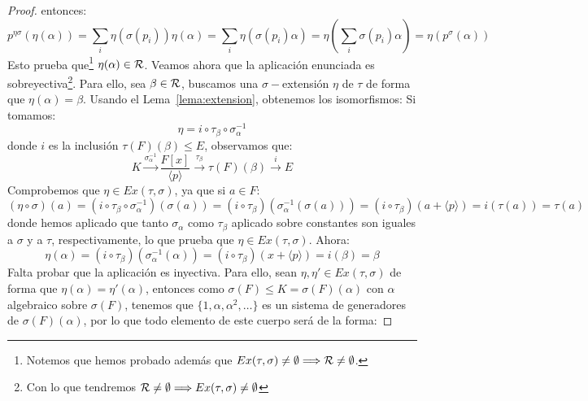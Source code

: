 \begin{prop}
\begin{proof}
        entonces:
        \begin{equation*}
            p^{\eta\sigma}(\eta(\alpha)) = \sum_i \eta(\sigma(p_i)) \eta(\alpha) = \sum_i \eta(\sigma(p_i)\alpha) = \eta\left(\sum_i \sigma(p_i) \alpha\right) = \eta(p^\sigma(\alpha))
        \end{equation*}
        Esto prueba que\footnote{Notemos que hemos probado además que $Ex(\tau,\sigma)\neq \emptyset \Longrightarrow \mathcal{R}\neq \emptyset $.} $\eta(\alpha)\in \mathcal{R}$. Veamos ahora que la aplicación enunciada es sobreyectiva\footnote{Con lo que tendremos $\mathcal{R}\neq \emptyset \Longrightarrow Ex(\tau,\sigma)\neq \emptyset $}. Para ello, sea $\beta\in \mathcal{R}$, buscamos una $\sigma-$extensión $\eta$ de $\tau$ de forma que $\eta(\alpha) = \beta$. Usando el Lema~\ref{lema:extension}, obtenemos los isomorfismos:
        Si tomamos:
        \begin{equation*}
            \eta = i \circ \tau_\beta \circ \sigma_\alpha^{-1}
        \end{equation*}
        donde $i$ es la inclusión $\tau(F)(\beta)\leq E$, observamos que:
        \begin{equation*}
            K\stackrel{\sigma_\alpha^{-1}}{\longrightarrow} \frac{F[x]}{\langle p \rangle } \stackrel{\tau_\beta}{\longrightarrow} \tau(F)(\beta) \stackrel{i}{\longrightarrow} E
        \end{equation*}
        Comprobemos que $\eta\in Ex(\tau,\sigma)$, ya que si $a\in F$:
        \begin{equation*}
            (\eta \circ \sigma)(a) = (i\circ \tau_\beta\circ \sigma_\alpha^{-1})(\sigma(a)) = (i\circ \tau_\beta)(\sigma_\alpha^{-1}(\sigma(a))) = (i\circ \tau_\beta)(a+\langle p \rangle ) = i(\tau(a)) = \tau(a)
        \end{equation*}
        donde hemos aplicado que tanto $\sigma_\alpha$ como $\tau_\beta$ aplicado sobre constantes son iguales a $\sigma$ y a $\tau$, respectivamente, lo que prueba que $\eta\in Ex(\tau,\sigma)$. Ahora:
        \begin{equation*}
            \eta(\alpha) = (i\circ \tau_\beta)(\sigma_\alpha^{-1}(\alpha))= (i\circ \tau_\beta)(x+\langle p \rangle ) = i(\beta) = \beta
        \end{equation*}
        Falta probar que la aplicación es inyectiva. Para ello, sean $\eta,\eta' \in Ex(\tau,\sigma)$ de forma que $\eta(\alpha)=\eta'(\alpha)$, entonces como $\sigma(F)\leq K=\sigma(F)(\alpha)$ con $\alpha$ algebraico sobre $\sigma(F)$, tenemos que $\{1,\alpha,\alpha^2, \ldots\}$ es un sistema de generadores de $\sigma(F)(\alpha)$, por lo que todo elemento de este cuerpo será de la forma:

\end{proof}
\end{prop}
